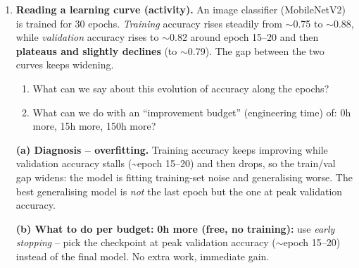 \documentclass[10pt,a4paper]{article}
\newcommand{\q}[1]{\item #1}
\begin{document}
\begin{enumerate}[leftmargin=*,label=\textbf{Q\arabic*.}]
\textbf{(e) List four regularisation methods and describe each in two sentences.}
\begin{answerbox}
\textbf{L2 (weight decay):} adds $\lambda\lVert\theta\rVert_2^2$ to the loss, penalising large weights. This shrinks all weights smoothly toward zero, giving a smoother, less complex function.

\textbf{L1:} adds $\lambda\lVert\theta\rVert_1$ to the loss. It drives many weights to exactly zero, producing sparse models and implicit feature selection.

\textbf{Dropout:} randomly zeros a fraction $p$ of activations each training step. This prevents co-adaptation of neurons and acts like training an ensemble of sub-networks, improving robustness.

\textbf{Early stopping:} monitor validation error during training and stop when it starts rising. This halts before the model overfits the training data, effectively limiting capacity. (Alternatives: \emph{data augmentation} -- enlarge/vary the dataset with label-preserving transforms; \emph{batch normalisation} -- adds noise/scaling that regularises.)
\end{answerbox}

\q \textbf{Reading a learning curve (activity).} An image classifier (MobileNetV2) is trained for 30 epochs. \emph{Training} accuracy rises steadily from $\sim$0.75 to $\sim$0.88, while \emph{validation} accuracy rises to $\sim$0.82 around epoch 15--20 and then \textbf{plateaus and slightly declines} (to $\sim$0.79). The gap between the two curves keeps widening.
\begin{enumerate}[label=\textbf{(\alph*)}]
  \item What can we say about this evolution of accuracy along the epochs?
  \item What can we do with an ``improvement budget'' (engineering time) of: 0h more, 15h more, 150h more?
\end{enumerate}
\begin{answerbox}
\textbf{(a) Diagnosis -- overfitting.} Training accuracy keeps improving while validation accuracy stalls (\textasciitilde epoch 15--20) and then drops, so the train/val gap widens: the model is fitting training-set noise and generalising worse. The best generalising model is \emph{not} the last epoch but the one at peak validation accuracy.

\textbf{(b) What to do per budget:}
\textbf{0h more (free, no training):} use \emph{early stopping} -- pick the checkpoint at peak validation accuracy ($\sim$epoch 15--20) instead of the final model. No extra work, immediate gain.


\end{answerbox}
\end{enumerate}
\end{document}
